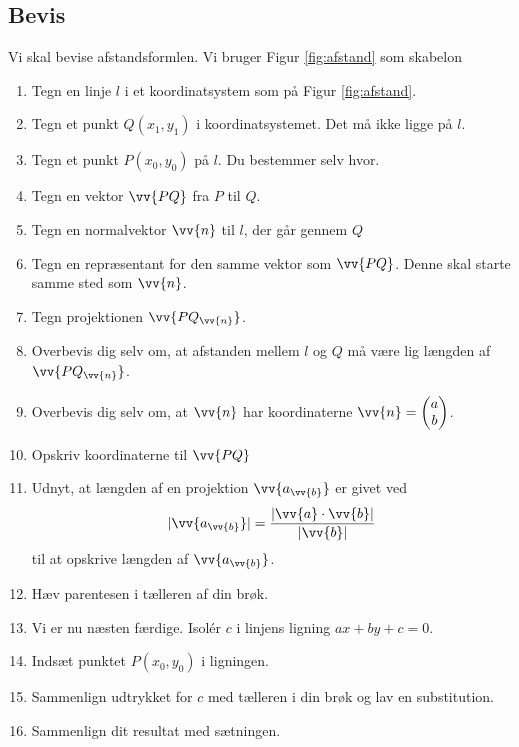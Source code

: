 \subsection*{Bevis}
Vi skal bevise afstandsformlen. Vi bruger Figur \ref{fig:afstand} som skabelon
\begin{enumerate}[label=\roman*)]
	\item Tegn en linje $l$ i et koordinatsystem som på Figur \ref{fig:afstand}.
	\item Tegn et punkt $Q(x_1,y_1)$ i koordinatsystemet. Det må ikke ligge på $l$.
	\item Tegn et punkt $P(x_0,y_0)$ på $l$. Du bestemmer selv hvor. 
	\item Tegn en vektor $\vv{PQ}$ fra $P$ til $Q$. 
	\item Tegn en normalvektor $\vv{n}$ til $l$, der går gennem $Q$
	\item Tegn en repræsentant for den samme vektor som $\vv{PQ}$. Denne skal starte samme sted som $\vv{n}$. 
	\item Tegn projektionen $\vv{PQ_{\vv{n}}}$.
	\item Overbevis dig selv om, at afstanden mellem $l$ og $Q$ må være lig længden af $\vv{PQ_{\vv{n}}}$.
	\item Overbevis dig selv om, at $\vv{n}$ har koordinaterne $\vv{n}=\begin{pmatrix}
	a \\ b
	\end{pmatrix}$.
	\item Opskriv koordinaterne til $\vv{PQ}$
	\item Udnyt, at længden af en projektion $\vv{a_{\vv{b}}}$ er givet ved
	\begin{align*}
		|\vv{a_{\vv{b}}}| = \frac{|\vv{a}\cdot \vv{b}|}{|\vv{b}|}
	\end{align*}
	til at opskrive længden af $\vv{a_{\vv{b}}}$.
	\item Hæv parentesen i tælleren af din brøk.
	\item Vi er nu næsten færdige. Isolér $c$ i linjens ligning $ax+by+c=0$. 
	\item Indsæt punktet $P(x_0,y_0)$ i ligningen. 
	\item Sammenlign udtrykket for $c$ med tælleren i din brøk og lav en substitution. 
	\item Sammenlign dit resultat med sætningen. 
\end{enumerate}
